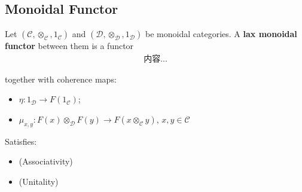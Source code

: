 \documentclass[Total.tex]{subfiles}
\begin{document}
				\subsection{Monoidal Functor}
			\begin{Def}
				Let $(\mathcal{C},\otimes_\mathcal{C},1_\mathcal{C})$ and $(\mathcal{D},\otimes_\mathcal{D},1_\mathcal{D})$ be monoidal categories. A \textbf{lax monoidal functor} between them is a functor 
				\begin{gather*}
					内容...
				\end{gather*}
				
				together with coherence maps:
				\begin{itemize}
					\item $\eta:1_\mathcal{D}\rightarrow F(1_\mathcal{C})$;
					\item $\mu_{x,y}:F(x)\otimes_\mathcal{D} F(y)\rightarrow F(x\otimes_\mathcal{C} y)$, $x,y\in \mathcal{C}$
				\end{itemize}
				
				Satisfies:
				\begin{itemize}
					\item (Associativity)
					\item (Unitality)
				\end{itemize}
			\end{Def}
\end{document}
